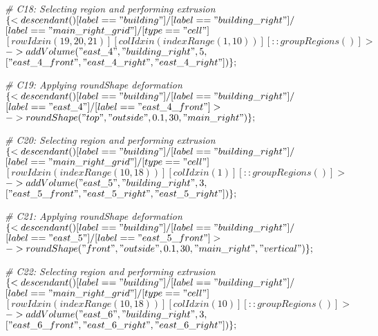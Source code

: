 \noindent \textit{\# C18: Selecting region and performing extrusion}\\
$\{< descendant() [label=="building"] / [label=="building\_right"] / $\\
$[label=="main\_right\_grid"] / [type=="cell"] $\\
$[rowIdx in (19, 20, 21)] [colIdx in (indexRange(1, 10))] [::groupRegions()] > $\\
$-> addVolume("east\_4", "building\_right", 5, $\\
$["east\_4\_front", "east\_4\_right", "east\_4\_right"])\};$

\noindent \textit{\# C19: Applying roundShape deformation}\\
$\{< descendant() [label=="building"] / [label=="building\_right"] / $\\
$[label=="east\_4"] / [label=="east\_4\_front"] > $\\
$-> roundShape("top", "outside", 0.1, 30, "main\_right")\};$

\noindent \textit{\# C20: Selecting region and performing extrusion}\\
$\{< descendant() [label=="building"] / [label=="building\_right"] / $\\
$[label=="main\_right\_grid"] / [type=="cell"] $\\
$[rowIdx in (indexRange(10, 18))] [colIdx in (1)] [::groupRegions()] > $\\
$-> addVolume("east\_5", "building\_right", 3, $\\
$["east\_5\_front", "east\_5\_right", "east\_5\_right"])\};$

\noindent \textit{\# C21: Applying roundShape deformation}\\
$\{< descendant() [label=="building"] / [label=="building\_right"] / $\\
$[label=="east\_5"] / [label=="east\_5\_front"] > $\\
$-> roundShape("front", "outside", 0.1, 30, "main\_right", "vertical")\};$

\noindent \textit{\# C22: Selecting region and performing extrusion}\\
$\{< descendant() [label=="building"] / [label=="building\_right"] / $\\
$[label=="main\_right\_grid"] / [type=="cell"] $\\
$[rowIdx in (indexRange(10, 18))] [colIdx in (10)] [::groupRegions()] > $\\
$-> addVolume("east\_6", "building\_right", 3, $\\
$["east\_6\_front", "east\_6\_right", "east\_6\_right"])\};$

